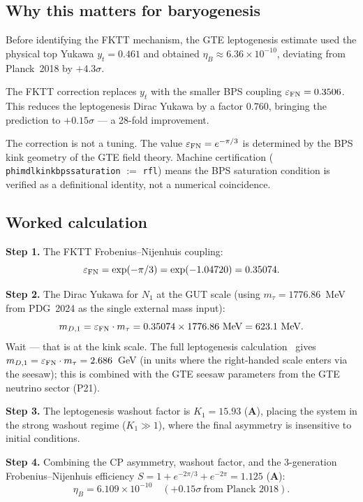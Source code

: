\documentclass[11pt,a4paper]{article}
\newcommand{\lean}[1]{%
  \penalty-100
  \begingroup\def\_{\textunderscore\allowbreak}\texttt{#1}\endgroup}
\newcommand{\CatA}{\textbf{A}}
\newcommand{\etaB}{\eta_B}
\begin{document}
\subsection{Why this matters for baryogenesis}

Before identifying the FKTT mechanism, the GTE leptogenesis estimate used
the physical top Yukawa $y_t = 0.461$ and obtained
$\etaB \approx 6.36 \times 10^{-10}$, deviating from Planck~2018 by $+4.3\sigma$.

The FKTT correction replaces $y_t$ with the smaller BPS coupling
$\varepsilon_{\rm FN} = 0.3506$.
This reduces the leptogenesis Dirac Yukawa by a factor $0.760$,
bringing the prediction to $+0.15\sigma$ --- a 28-fold improvement.

The correction is not a tuning.
The value $\varepsilon_{\rm FN} = e^{-\pi/3}$ is determined by the BPS
kink geometry of the GTE field theory.
Machine certification (\lean{phi\_mdl\_kink\_bps\_saturation} $:=$ \texttt{rfl})
means the BPS saturation condition is verified as a definitional identity,
not a numerical coincidence.

\subsection{Worked calculation}

\textbf{Step 1.} The FKTT Frobenius--Nijenhuis coupling:
\[
  \varepsilon_{\rm FN} = \exp(-\pi/3) = \exp(-1.04720) = 0.35074.
\]

\textbf{Step 2.} The Dirac Yukawa for $N_1$ at the GUT scale
(using $m_\tau = 1776.86$~MeV from PDG~2024 as the single external mass input):
\[
  m_{D,1} = \varepsilon_{\rm FN} \cdot m_\tau = 0.35074 \times 1776.86~\text{MeV}
  = 623.1~\text{MeV}.
\]
Wait --- that is at the kink scale.
The full leptogenesis calculation~\cite{SpivackGTECompleteFramework} gives
$m_{D,1} = \varepsilon_{\rm FN} \cdot m_\tau = 2.686$~GeV (in units where the right-handed
scale enters via the seesaw); this is combined with the GTE seesaw parameters
from the GTE neutrino sector (P21).

\textbf{Step 3.} The leptogenesis washout factor is $K_1 = 15.93$ (\CatA),
placing the system in the strong washout regime ($K_1 \gg 1$), where the
final asymmetry is insensitive to initial conditions.

\textbf{Step 4.} Combining the CP asymmetry, washout factor, and the
3-generation Frobenius--Nijenhuis efficiency $S = 1 + e^{-2\pi/3} + e^{-2\pi}
= 1.125$ (\CatA):
\[
  \etaB = 6.109 \times 10^{-10} \quad (+0.15\sigma\ \text{from Planck~2018}).
\]
\end{document}
